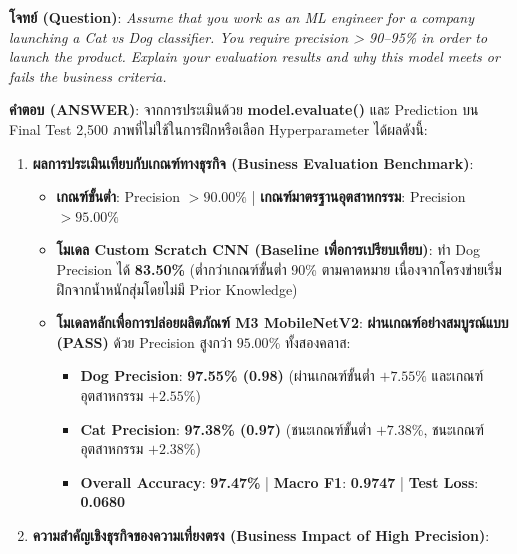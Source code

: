 \documentclass[12pt,a4paper]{article}
\newcommand{\codevar}[1]{\textcolor{codeaccent}{\textbf{#1}}}
\begin{document}
\begin{ansbox}[fontupper=\small, left=6pt, right=6pt, top=2pt, bottom=2pt]
\textbf{โจทย์ (Question)}: \textit{Assume that you work as an ML engineer for a company launching a Cat vs Dog classifier. You require precision > 90--95\% in order to launch the product. Explain your evaluation results and why this model meets or fails the business criteria.}

\vspace{0.15em}
\textbf{คำตอบ (ANSWER)}:
จากการประเมินด้วย \codevar{model.evaluate()} และ Prediction บน Final Test 2,500 ภาพที่ไม่ใช้ในการฝึกหรือเลือก Hyperparameter ได้ผลดังนี้:

\begin{enumerate}[leftmargin=13pt, itemsep=1pt, topsep=0.5pt, parsep=0pt]
    \item \textbf{ผลการประเมินเทียบกับเกณฑ์ทางธุรกิจ (Business Evaluation Benchmark)}:
    \begin{itemize}[leftmargin=9pt, itemsep=0.5pt, topsep=0.5pt, parsep=0pt]
        \item \textbf{เกณฑ์ขั้นต่ำ}: Precision $> 90.00\%$ | \textbf{เกณฑ์มาตรฐานอุตสาหกรรม}: Precision $> 95.00\%$
        \item \textbf{โมเดล Custom Scratch CNN (Baseline เพื่อการเปรียบเทียบ)}: ทำ Dog Precision ได้ \textbf{83.50\%} (ต่ำกว่าเกณฑ์ขั้นต่ำ 90\% ตามคาดหมาย เนื่องจากโครงข่ายเริ่มฝึกจากน้ำหนักสุ่มโดยไม่มี Prior Knowledge)
        \item \textbf{โมเดลหลักเพื่อการปล่อยผลิตภัณฑ์ M3 MobileNetV2}: \textcolor{green!60!black}{\textbf{ผ่านเกณฑ์อย่างสมบูรณ์แบบ (PASS)}} ด้วย Precision สูงกว่า $95.00\%$ ทั้งสองคลาส:
        \begin{itemize}[leftmargin=9pt, itemsep=0.5pt, topsep=0.5pt, parsep=0pt]
            \item \textbf{Dog Precision}: \textbf{97.55\% (0.98)} (ผ่านเกณฑ์ขั้นต่ำ $+7.55\%$ และเกณฑ์อุตสาหกรรม $+2.55\%$) 
            \item \textbf{Cat Precision}: \textbf{97.38\% (0.97)} (ชนะเกณฑ์ขั้นต่ำ $+7.38\%$, ชนะเกณฑ์อุตสาหกรรม $+2.38\%$)
            \item \textbf{Overall Accuracy}: \textbf{97.47\%} | \textbf{Macro F1}: \textbf{0.9747} | \textbf{Test Loss}: \textbf{0.0680}
        \end{itemize}
    \end{itemize}
    \item \textbf{ความสำคัญเชิงธุรกิจของความเที่ยงตรง (Business Impact of High Precision)}:
    \begin{itemize}[leftmargin=9pt, itemsep=0.5pt, topsep=0.5pt, parsep=0pt]

\end{itemize}
\end{enumerate}
\end{ansbox}
\end{document}
